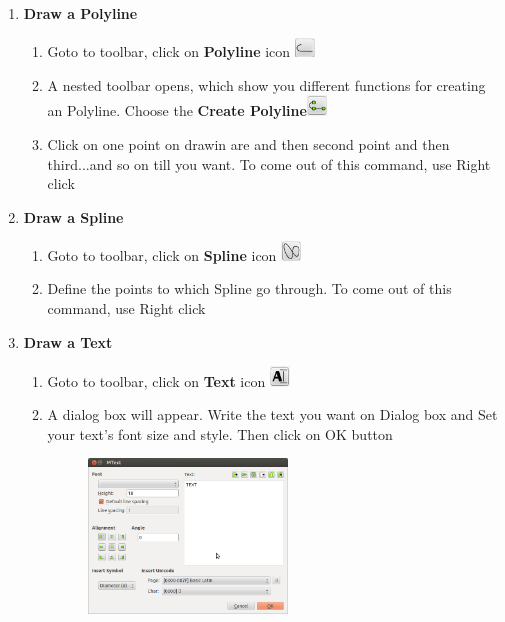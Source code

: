 \begin{enumerate}
%
\vspace{.25in}
\item{\textbf{Draw a Polyline}
    \begin{enumerate}
    \item{Goto to toolbar, click on \textbf{Polyline} icon \includegraphics[width=20px]{./images/polyline.png}}
    \item{A nested toolbar opens, which show you different functions for creating an Polyline. Choose the \textbf{Create Polyline}\includegraphics[width=20px]{./images/create_polyline.png}}
    \item{Click on one point on drawin are and then second point and then third...and so on till you want. To come out of this command, use Right click}
    \end{enumerate}}
%
\vspace{.25in}
\item{\textbf{Draw a Spline}\begin{enumerate}
    \item{Goto to toolbar, click on \textbf{Spline} icon \includegraphics[width=20px]{./images/spline.png}}
    \item{Define the points to which Spline go through. To come out of this command, use Right click}\end{enumerate}}
%
\vspace{.25in}
\item{\textbf{Draw a Text}\begin{enumerate}
    \item{Goto to toolbar, click on \textbf{Text} icon \includegraphics[width=20px]{./images/text.png}}
    \item{A dialog box will appear. Write the text you want on Dialog box and Set your text's font size and style. Then click on OK button
    \begin{figure}[h!] \centering \includegraphics[width=200px]{./images/text_set.png} \end{figure}}

\end{enumerate}}
\end{enumerate}
